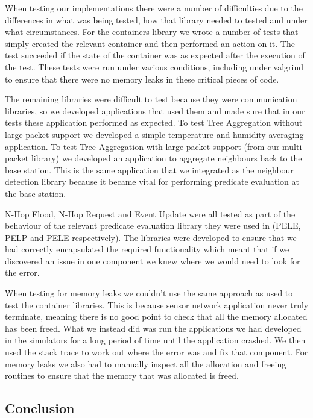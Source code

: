 When testing our implementations there were a number of difficulties due to the differences in what was being tested, how that library needed to tested and under what circumstances. For the containers library we wrote a number of tests that simply created the relevant container and then performed an action on it. The test succeeded if the state of the container was as expected after the execution of the test. These tests were run under various conditions, including under valgrind to ensure that there were no memory leaks in these critical pieces of code.

The remaining libraries were difficult to test because they were communication libraries, so we developed applications that used them and made sure that in our tests these application performed as expected. To test Tree Aggregation without large packet support we developed a simple temperature and humidity averaging application. To test Tree Aggregation with large packet support (from our multi-packet library) we developed an application to aggregate neighbours back to the base station. This is the same application that we integrated as the neighbour detection library because it became vital for performing predicate evaluation at the base station.

N-Hop Flood, N-Hop Request and Event Update were all tested as part of the behaviour of the relevant predicate evaluation library they were used in (PELE, PELP and PELE respectively). The libraries were developed to ensure that we had correctly encapsulated the required functionality which meant that if we discovered an issue in one component we knew where we would need to look for the error.

When testing for memory leaks we couldn't use the same approach as used to test the container libraries. This is because sensor network application never truly terminate, meaning there is no good point to check that all the memory allocated has been freed. What we instead did was run the applications we had developed in the simulators for a long period of time until the application crashed. We then used the stack trace to work out where the error was and fix that component. For memory leaks we also had to manually inspect all the allocation and freeing routines to ensure that the memory that was allocated is freed.


\subsection{Conclusion}

